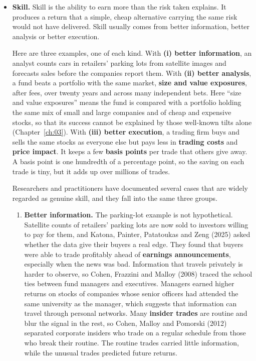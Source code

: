 \begin{itemize}
  \item \textbf{Skill.} Skill is the ability to earn more than the risk taken
  explains. It produces a return that a simple, cheap alternative carrying the
  same risk would not have delivered. Skill usually comes from better
  information, better analysis or better execution.

  Here are three examples, one of each kind. 
  With \textbf{(i) better
  information}, an analyst counts cars in retailers' parking lots from
  satellite images and forecasts sales before the companies report them.
  With \textbf{(ii) better analysis}, a fund beats a portfolio with the same
  market, \textbf{size and value exposures}, after fees, over twenty years and across
  many independent bets. Here ``size and value exposures'' means the fund is
  compared with a portfolio holding the same mix of small and large companies
  and of cheap and expensive stocks, so that its success cannot be explained
  by those well-known tilts alone (Chapter~\ref{ch:03}).
  With \textbf{(iii) better execution}, a trading firm
  buys and sells the same stocks as everyone else but pays less in \textbf{trading
  costs} and \textbf{price impact}. It keeps a few \textbf{basis points} per trade that others
  give away. A basis point is one hundredth of a percentage point, so the
  saving on each trade is tiny, but it adds up over millions of trades.

  
  Researchers and practitioners have documented several cases that are widely
  regarded as genuine skill, and they fall into the same three groups.
  
  \begin{enumerate}
    \item \textbf{Better information.} The parking-lot example is not hypothetical.
  Satellite counts of retailers' parking lots are now sold to investors
  willing to pay for them, and Katona, Painter, Patatoukas and Zeng (2025)
  asked whether the data give their buyers a real edge. They found that
  buyers were able to trade profitably ahead of \textbf{earnings announcements},
  especially when the news was bad. Information that travels privately is
  harder to observe, so Cohen, Frazzini and Malloy (2008) traced the school
  ties between fund managers and executives. Managers earned higher returns
  on stocks of companies whose senior officers had attended the same
  university as the manager, which suggests that information can travel
  through personal networks. Many \textbf{insider trades} are routine and blur the
  signal in the rest, so Cohen, Malloy and Pomorski (2012) separated
  corporate insiders who trade on a regular schedule from those who break
  their routine. The routine trades carried little information, while the
  unusual trades predicted future returns.


\end{enumerate}
\end{itemize}
